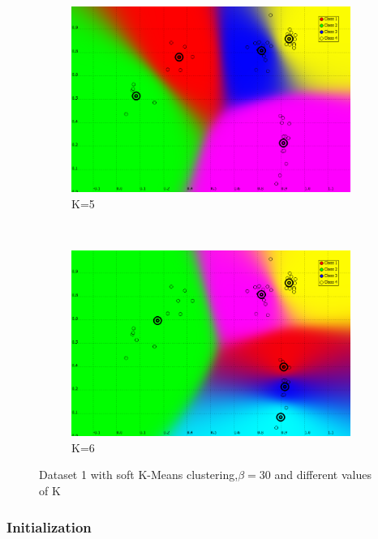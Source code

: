 \documentclass[a4paper,10pt]{article}
\begin{document}
\begin{figure}[H]
      ~
    \begin{subfigure}[t]{0.2\textwidth}
      \centering
      \includegraphics[width=\textwidth]{pictures/dataset_1_soft-Kmeans-5K-beta30}
      \caption{K=5}
      \label{fig:dataset_1_soft-Kmeans-5K-beta30}
     \end{subfigure}
      ~
    \begin{subfigure}[t]{0.2\textwidth}
      \centering
      \includegraphics[width=\textwidth]{pictures/dataset_1_soft-Kmeans-6K-beta30}
      \caption{K=6}
      \label{fig:dataset_1_soft-Kmeans-6K-beta30}
     \end{subfigure}
     \caption{Dataset 1 with soft K-Means clustering,$\beta = 30$ and different values of K}
     \label{fig:soft_kmeans_varyk}
\end{figure}

\subsubsection*{Initialization}
\end{document}
